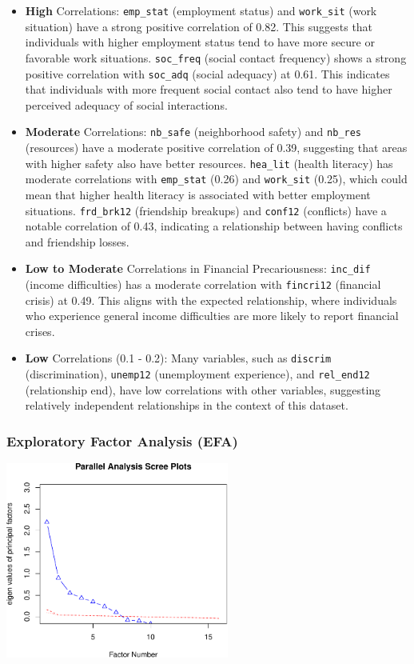 \documentclass[
]{article}
\begin{document}
\begin{itemize}
\item
  \textbf{High} Correlations: \texttt{emp\_stat} (employment status) and
  \texttt{work\_sit} (work situation) have a strong positive correlation
  of 0.82. This suggests that individuals with higher employment status
  tend to have more secure or favorable work situations.
  \texttt{soc\_freq} (social contact frequency) shows a strong positive
  correlation with \texttt{soc\_adq} (social adequacy) at 0.61. This
  indicates that individuals with more frequent social contact also tend
  to have higher perceived adequacy of social interactions.
\item
  \textbf{Moderate} Correlations: \texttt{nb\_safe} (neighborhood
  safety) and \texttt{nb\_res} (resources) have a moderate positive
  correlation of 0.39, suggesting that areas with higher safety also
  have better resources. \texttt{hea\_lit} (health literacy) has
  moderate correlations with \texttt{emp\_stat} (0.26) and
  \texttt{work\_sit} (0.25), which could mean that higher health
  literacy is associated with better employment situations.
  \texttt{frd\_brk12} (friendship breakups) and \texttt{conf12}
  (conflicts) have a notable correlation of 0.43, indicating a
  relationship between having conflicts and friendship losses.
\item
  \textbf{Low to Moderate} Correlations in Financial Precariousness:
  \texttt{inc\_dif} (income difficulties) has a moderate correlation
  with \texttt{fincri12} (financial crisis) at 0.49. This aligns with
  the expected relationship, where individuals who experience general
  income difficulties are more likely to report financial crises.
\item
  \textbf{Low} Correlations (0.1 - 0.2): Many variables, such as
  \texttt{discrim} (discrimination), \texttt{unemp12} (unemployment
  experience), and \texttt{rel\_end12} (relationship end), have low
  correlations with other variables, suggesting relatively independent
  relationships in the context of this dataset.
\end{itemize}

\subsubsection{Exploratory Factor Analysis
(EFA)}\label{exploratory-factor-analysis-efa}

\begin{center}
\includegraphics[width=0.55\textwidth,height=\textheight]{draft_v2_files/figure-pdf/unnamed-chunk-13-1.pdf}
\end{center}
\end{document}

